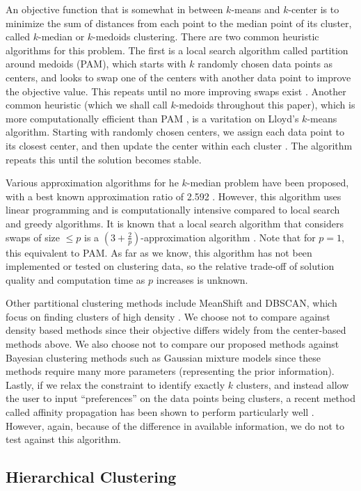 \documentclass{article}
\begin{document}
An objective function that is somewhat in between $k$-means and $k$-center is to minimize the sum of distances from each point to the median point of its cluster, called $k$-median or $k$-medoids clustering.  There are two common heuristic algorithms for this problem. The first is a local search algorithm called partition around medoids (PAM), which starts with $k$ randomly chosen data points as centers, and looks to swap one of the centers with another data point to improve the objective value.  This repeats until no more improving swaps exist \cite{ESL}. 
Another common heuristic (which we shall call $k$-medoids throughout this paper), which is more computationally efficient than PAM \cite{Park}, is a varitation on Lloyd's $k$-means algorithm.  Starting with randomly chosen centers, we assign each data point to its closest center, and then update the center within each cluster \cite{Park}. The algorithm repeats this until the solution becomes stable.

Various approximation algorithms for he $k$-median problem have been proposed, with a best known approximation ratio of 2.592 \cite{Wu}. However, this algorithm uses linear programming and is computationally intensive compared to local search and greedy algorithms.  It is known that a local search algorithm that considers swaps of size $\leq p$ is a $(3 + \frac{2}{p})$-approximation algorithm \cite{Arya}. Note that for $p=1$, this equivalent to PAM.  As far as we know, this algorithm has not been implemented or tested on clustering data, so the relative trade-off of solution quality and computation time as $p$ increases is unknown.

Other partitional clustering methods include MeanShift and DBSCAN, which focus on finding clusters of high density \cite{Comaniciu, Ester}. We choose not to compare against density based methods since their objective differs widely from the center-based methods above. We also choose not to compare our proposed methods against Bayesian clustering methods such as Gaussian mixture models since these methods require many more parameters (representing the prior information).  Lastly, if we relax the constraint to identify exactly $k$ clusters, and instead allow the user to input ``preferences'' on the data points being clusters, a recent method called affinity propagation has been shown to perform particularly well \cite{Frey}.  However, again, because of the difference in available information, we do not to test against this algorithm.  

\subsection{Hierarchical Clustering}
\end{document}
